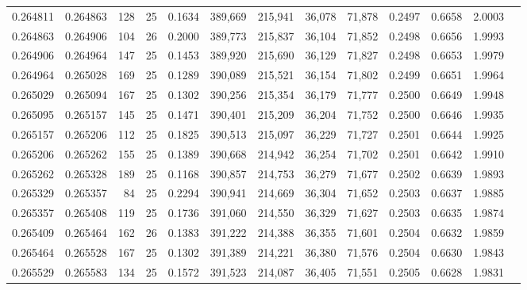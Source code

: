 \begin{tabular}{rrrrrrrrrrrrr}
0.264811 & 0.264863 &   128 &  25 &                                     0.1634 & 389,669 & 215,941 &  36,078 &  71,878 & 0.2497 & 0.6658 & 2.0003 \\
0.264863 & 0.264906 &   104 &  26 &                                     0.2000 & 389,773 & 215,837 &  36,104 &  71,852 & 0.2498 & 0.6656 & 1.9993 \\
0.264906 & 0.264964 &   147 &  25 &                                     0.1453 & 389,920 & 215,690 &  36,129 &  71,827 & 0.2498 & 0.6653 & 1.9979 \\
0.264964 & 0.265028 &   169 &  25 &                                     0.1289 & 390,089 & 215,521 &  36,154 &  71,802 & 0.2499 & 0.6651 & 1.9964 \\
0.265029 & 0.265094 &   167 &  25 &                                     0.1302 & 390,256 & 215,354 &  36,179 &  71,777 & 0.2500 & 0.6649 & 1.9948 \\
0.265095 & 0.265157 &   145 &  25 &                                     0.1471 & 390,401 & 215,209 &  36,204 &  71,752 & 0.2500 & 0.6646 & 1.9935 \\
0.265157 & 0.265206 &   112 &  25 &                                     0.1825 & 390,513 & 215,097 &  36,229 &  71,727 & 0.2501 & 0.6644 & 1.9925 \\
0.265206 & 0.265262 &   155 &  25 &                                     0.1389 & 390,668 & 214,942 &  36,254 &  71,702 & 0.2501 & 0.6642 & 1.9910 \\
0.265262 & 0.265328 &   189 &  25 &                                     0.1168 & 390,857 & 214,753 &  36,279 &  71,677 & 0.2502 & 0.6639 & 1.9893 \\
0.265329 & 0.265357 &    84 &  25 &                                     0.2294 & 390,941 & 214,669 &  36,304 &  71,652 & 0.2503 & 0.6637 & 1.9885 \\
0.265357 & 0.265408 &   119 &  25 &                                     0.1736 & 391,060 & 214,550 &  36,329 &  71,627 & 0.2503 & 0.6635 & 1.9874 \\
0.265409 & 0.265464 &   162 &  26 &                                     0.1383 & 391,222 & 214,388 &  36,355 &  71,601 & 0.2504 & 0.6632 & 1.9859 \\
0.265464 & 0.265528 &   167 &  25 &                                     0.1302 & 391,389 & 214,221 &  36,380 &  71,576 & 0.2504 & 0.6630 & 1.9843 \\
0.265529 & 0.265583 &   134 &  25 &                                     0.1572 & 391,523 & 214,087 &  36,405 &  71,551 & 0.2505 & 0.6628 & 1.9831 \\

\end{tabular}
